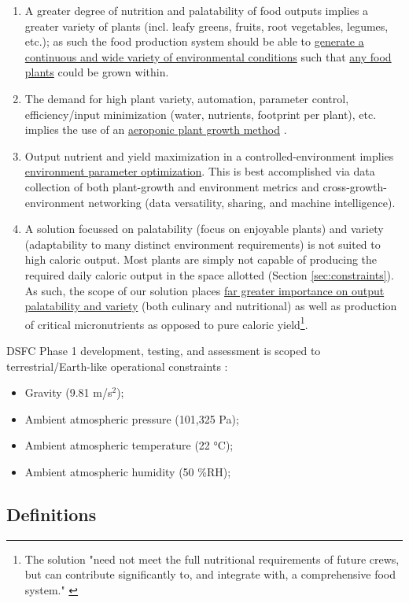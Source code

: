 \documentclass{../tex/report}
\begin{document}
\begin{enumerate}[label=SC\arabic*., ref=SC\arabic*]
\newpage
\item \label{sc:5} A greater degree of nutrition and palatability of food outputs implies a greater variety of plants (incl. leafy greens, fruits, root vegetables, legumes, etc.); as such the food production system should be able to \uline{generate a continuous and wide variety of environmental conditions} such that \uline{any food plants} could be grown within.
\item \label{sc:6} The demand for high plant variety, automation, parameter control, efficiency/input minimization (water, nutrients, footprint per plant), etc. implies the use of an \uline{aeroponic plant growth method} \cite{spinoff}.
\item \label{sc:7} Output nutrient and yield maximization in a controlled-environment implies \uline{environment parameter optimization}. 
    This is best accomplished via data collection of both plant-growth and environment metrics and cross-growth-environment networking (data versatility, sharing, and machine intelligence).
\item \label{sc:8} A solution focussed on palatability (focus on enjoyable plants) and variety (adaptability to many distinct environment requirements) is not suited to high caloric output. 
    Most plants are simply not capable of producing the required daily caloric output in the space allotted (Section \ref{sec:constraints}). 
    As such, the scope of our solution places \uline{far greater importance on output palatability and variety} (both culinary and nutritional) as well as production of critical micronutrients as opposed to pure caloric 
    yield\footnote{The solution "need not meet the full nutritional requirements of future crews, but can contribute significantly to, and integrate with, a comprehensive food system." \cite{applicantguide}}.
\end{enumerate}
DSFC Phase 1 development, testing, and assessment is scoped to terrestrial/Earth-like operational constraints \cite{applicantguide,dsfc-phase2}:
\begin{itemize}
    \item Gravity (9.81 m/s${}^2$);
    \item Ambient atmospheric pressure (101,325 Pa);
    \item Ambient atmospheric temperature (22 °C);
    \item Ambient atmospheric humidity (50 \%RH);
\end{itemize}

\newpage
\subsection{Definitions}
\label{sec:definitions}
\end{document}
